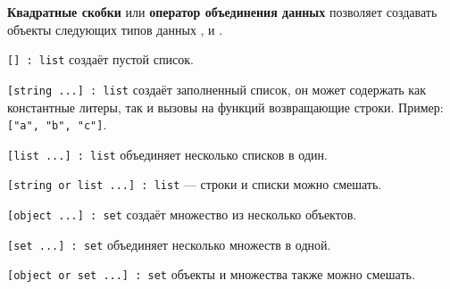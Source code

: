 {\bf Квадратные скобки} или {\bf оператор объединения данных} позволяет создавать объекты следующих типов данных \listtype{}, \set{} и \object{}.

\texttt{[] : list} создаёт пустой список.

\texttt{[string ...] : list} создаёт заполненный список, он может содержать как константные литеры, так и вызовы на функций возвращающие строки. Пример: \texttt{["a", "b", "c"]}.

\texttt{[list ...] : list} объединяет несколько списков в один.

\texttt{[string or list ...] : list} — строки и списки можно смешать.

\texttt{[object ...] : set} создаёт множество из несколько объектов.

\texttt{[set ...] : set} объединяет несколько множеств в одной.

\texttt{[object or set ...] : set} объекты и множества также можно смешать.

